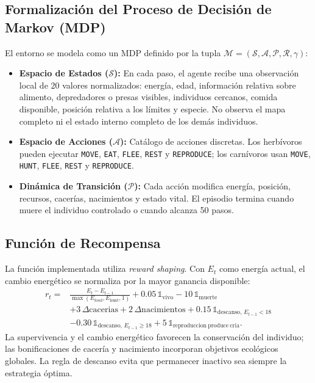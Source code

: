 \documentclass[conference]{IEEEtran}
\begin{document}
\subsection{Formalización del Proceso de Decisión de Markov (MDP)}
El entorno se modela como un MDP definido por la tupla $\mathcal{M} = 
(\mathcal{S}, \mathcal{A}, \mathcal{P}, \mathcal{R}, \gamma)$:
\begin{itemize}
    \item \textbf{Espacio de Estados ($\mathcal{S}$):} En cada paso, el agente
     recibe una observación local de 20 valores normalizados: energía, edad,
     información relativa sobre alimento, depredadores o presas visibles,
     individuos cercanos, comida disponible, posición relativa a los límites
     y especie. No observa el mapa completo ni el estado interno completo de
     los demás individuos.
    \item \textbf{Espacio de Acciones ($\mathcal{A}$):} Catálogo de acciones 
    discretas. Los herbívoros pueden ejecutar \texttt{MOVE}, \texttt{EAT},
    \texttt{FLEE}, \texttt{REST} y \texttt{REPRODUCE}; los carnívoros usan
    \texttt{MOVE}, \texttt{HUNT}, \texttt{FLEE}, \texttt{REST} y
    \texttt{REPRODUCE}.
    \item \textbf{Dinámica de Transición ($\mathcal{P}$):} Cada acción modifica
    energía, posición, recursos, cacerías, nacimientos y estado vital. El
    episodio termina cuando muere el individuo controlado o cuando alcanza
    50 pasos.
\end{itemize}

\subsection{Función de Recompensa}
La función implementada utiliza \textit{reward shaping}. Con
$E_t$ como energía actual, el cambio energético se normaliza por la mayor
ganancia disponible:
\begin{equation}
\begin{split}
r_t ={}& \frac{E_t-E_{t-1}}{\max(E_{\mathrm{food}},
E_{\mathrm{hunt}},1)} + 0.05\,\mathbb{1}_{\mathrm{vivo}}
-10\,\mathbb{1}_{\mathrm{muerte}}\\
&+3\,\Delta\mathrm{cacerias}+2\,\Delta\mathrm{nacimientos}
+0.15\,\mathbb{1}_{\mathrm{descanso},\,E_{t-1}<18}\\
&-0.30\,\mathbb{1}_{\mathrm{descanso},\,E_{t-1}\geq18}
+5\,\mathbb{1}_{\mathrm{reproduccion\ produce\ cria}}.
\end{split}
\label{eq:reward}
\end{equation}
La supervivencia y el cambio energético favorecen la conservación del
individuo; las bonificaciones de cacería y nacimiento incorporan objetivos
ecológicos globales. La regla de descanso evita que permanecer inactivo sea
siempre la estrategia óptima.
\end{document}
